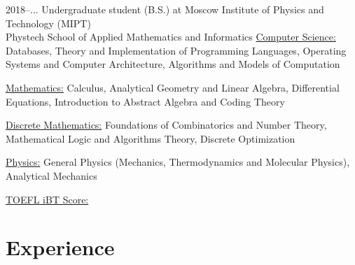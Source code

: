 \documentclass[]{cv-style}          %
\begin{document}
\begin{entrylist}
\entry
    {2018--...}
    {{\normalfont Undergraduate student (B.S.) at} Moscow Institute of Physics and Technology (MIPT) \\ }
    {Phystech School of Applied Mathematics and Informatics}
    {\vspace{-0.3cm}}
\entry 
    {}
    {\underline{Computer Science:} {\normalfont Databases, Theory and Implementation of Programming Languages, Operating Systems and Computer Architecture, Algorithms and Models of Computation}}
    {\vspace{-0.5cm}}
    
\entry 
    {}
    {\underline{Mathematics:} {\normalfont Calculus, Analytical Geometry and Linear Algebra, Differential Equations, Introduction to Abstract Algebra and Coding Theory}}
    {\vspace{-0.5cm}}
    
\entry 
    {}
    {\underline{Discrete Mathematics:} {\normalfont Foundations of Combinatorics and Number Theory, Mathematical Logic and Algorithms Theory, Discrete Optimization}}
    {\vspace{-0.5cm}}
    
\entry 
    {}
    {\underline{Physics:} {\normalfont General Physics (Mechanics, Thermodynamics and Molecular Physics), Analytical Mechanics}} 
    {\vspace{-0.3cm}}

\entry 
    {}
    {\underline{TOEFL iBT Score:} {}}
    {\vspace{-0.3cm}}


\end{entrylist}


\section{Experience}
\end{document}
